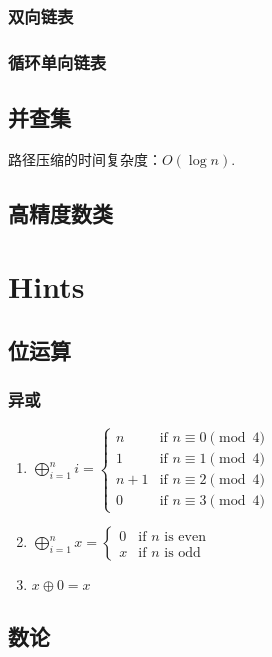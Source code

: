 \documentclass{code}
\newcommand{\fzd}[1]{\ensuremath{O\left(#1\right)}}
\newcommand{\code}[1]{}
\begin{document}
\subsubsection{双向链表}
\code{DoubleLinkedList}
\subsubsection{循环单向链表}
\code{CircularSingleLinkedList}
\subsection{并查集}
路径压缩的时间复杂度：\fzd{\log n}.
\code{UnionFind}
\subsection{高精度数类}
\code{BigInteger}
\newpage
\section{Hints}
\subsection{位运算}
\subsubsection{异或}
\begin{enumerate}[label=\arabic*)]
    \item $\displaystyle\bigoplus_{i=1}^{n} i =
        \begin{cases}
            n      & \text{if } n \equiv 0 \pmod{4} \\
            1      & \text{if } n \equiv 1 \pmod{4} \\
            n + 1  & \text{if } n \equiv 2 \pmod{4} \\
            0      & \text{if } n \equiv 3 \pmod{4}
        \end{cases}$
    \item $\displaystyle\bigoplus_{i=1}^{n} x =
        \begin{cases}
            0 & \text{if $n$ is even} \\
            x & \text{if $n$ is odd}
        \end{cases}$
    \item $x \oplus 0 = x$
\end{enumerate}
\subsection{数论}
\end{document}
